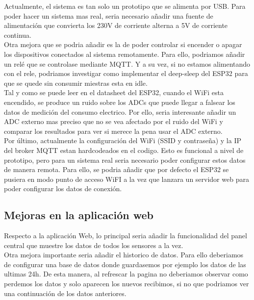 \begin{titlepage}
Actualmente, el sistema es tan solo un prototipo que se alimenta por USB. Para poder hacer un sistema mas real, seria necesario añadir una fuente de alimentación\cite{ref24} que convierta los 230V de corriente alterna a 5V de corriente continua.\\

Otra mejora que se podria añadir es la de poder controlar si encender o apagar los dispositivos conectados al sistema remotamente. Para ello, podriamos añadir un relé que se controlase mediante MQTT. Y a su vez, si no estamos alimentando con el rele, podriamos investigar como implementar el deep-sleep del ESP32 para que se quede sin consumir miestras esta en idle.\\

Tal y como se puede leer en el datasheet del ESP32, cuando el WiFi esta encendido, se produce un ruido sobre los ADCs que puede llegar a falsear los datos de medición del consumo electrico. Por ello, seria interesante añadir un ADC externo mas preciso que no se vea afectado por el ruido del WiFi y comparar los resultados para ver si merece la pena usar el ADC externo. \\

Por último, actualmente la configuración del WiFi (SSID y contraseña) y la IP del broker MQTT estan hardcodeados en el codigo. Esto es funcional a nivel de prototipo, pero para un sistema real seria necesario poder configurar estos datos de manera remota. Para ello, se podria añadir que por defecto el ESP32 se pusiera en modo punto de acceso WiFI a la vez que lanzara un servidor web para poder configurar los datos de conexión. \\
\subsection{Mejoras en la aplicación web}
Respecto a la aplicación Web, lo principal seria añadir la funcionalidad del panel central que muestre los datos de todos los sensores a la vez. \\
Otra mejora importante seria añadir el historico de datos. Para ello deberiamos de configurar una base de datos donde guardasemos por ejemplo los datos de las ultimas 24h. De esta manera, al refrescar la pagina no deberiamos observar como perdemos los datos y solo aparecen los nuevos recibimos, si no que podriamos ver una continuación de los datos anteriores. \\

\end{titlepage}
